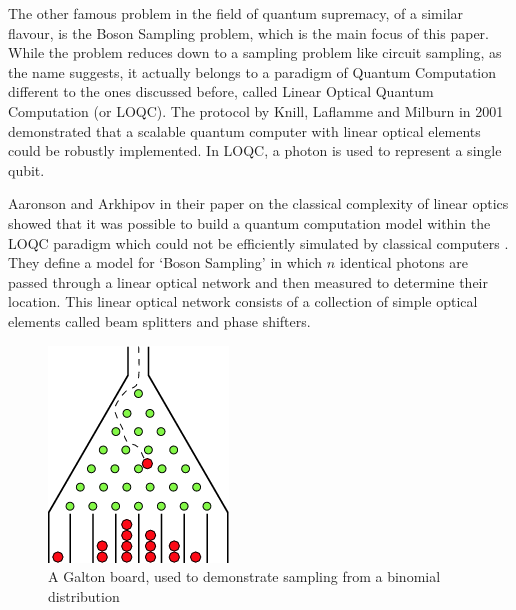 \documentclass[11pt]{article}
\theoremstyle{theorem}
\theoremstyle{remark}
\theoremstyle{plain}
\theoremstyle{definition}
\begin{document}
The other famous problem in the field of quantum supremacy, of a similar flavour, is the Boson Sampling problem, which is the main focus of this paper. While the problem reduces down to a sampling problem like circuit sampling, as the name suggests, it actually belongs to a paradigm of Quantum Computation different to the ones discussed before, called Linear Optical Quantum Computation (or LOQC). The protocol by Knill, Laflamme and Milburn in 2001 \cite{knill2001} demonstrated that a scalable quantum computer with linear optical elements could be robustly implemented. In LOQC, a photon is used to represent a single qubit.

Aaronson and Arkhipov in their paper on the classical complexity of linear optics showed that it was possible to build a quantum computation model within the LOQC paradigm which could not be efficiently simulated by classical computers \cite{aaronson2011}. They define a model for `Boson Sampling' in which $n$ identical photons are passed through a linear optical network and then measured to determine their location. This linear optical network consists of a collection of simple optical elements called beam splitters and phase shifters.

\begin{figure}
	\centering
  \includegraphics[width=\linewidth/3]{galton_board}
  \caption{A Galton board, used to demonstrate sampling from a binomial distribution \cite{galton_board}}
  \label{fig:galton_board}
\end{figure}
\end{document}
